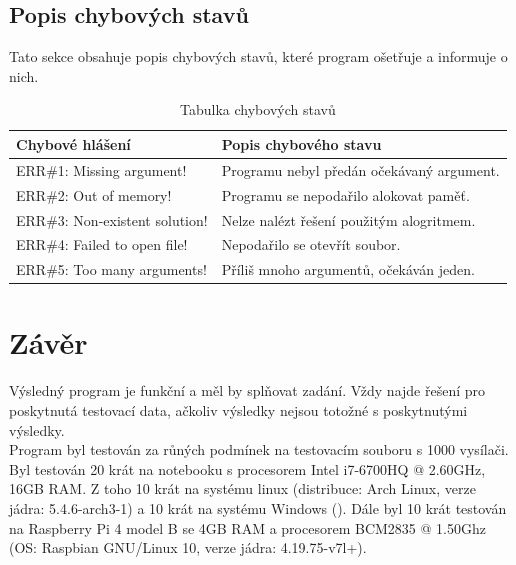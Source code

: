 \documentclass[12pt]{article}
\begin{document}
\subsection{Popis chybových stavů}
Tato sekce obsahuje popis chybových stavů, které program ošetřuje a informuje
o nich.
%
\begin{table}[H]
        \begin{tabular}{|l|p{6.35cm}|}
                \hline
                \bf Chybové hlášení & \bf Popis chybového stavu \\
                \hline
                ERR\#1: Missing argument! & Programu nebyl předán očekávaný
		argument.\\
		\hline
                ERR\#2: Out of memory! & Programu se nepodařilo alokovat
		paměť.\\
                \hline
                ERR\#3: Non-existent solution! & Nelze nalézt řešení použitým
		alogritmem.\\
                \hline
                ERR\#4: Failed to open file! & Nepodařilo se otevřít soubor.\\
                \hline
                ERR\#5: Too many arguments! & Příliš mnoho argumentů, očekáván
		jeden.\\
                \hline
        \end{tabular}
        \caption{Tabulka chybových stavů}
        \label{tab:err}
\end{table}
%
%
\section{Závěr}
%
Výsledný program je funkční a měl by splňovat zadání. Vždy najde řešení pro
poskytnutá testovací data, ačkoliv výsledky nejsou totožné s poskytnutými
výsledky.\\

Program byl testován za růných podmínek na testovacím souboru s 1000 vysílači.
Byl testován 20 krát na notebooku s 
procesorem Intel i7-6700HQ @ 2.60GHz, 16GB RAM. Z toho 10 krát na systému linux
(distribuce: Arch Linux, verze jádra: 5.4.6-arch3-1) a 10 krát na systému
Windows (). Dále byl 10 krát testován na Raspberry Pi 4 model B se 4GB RAM a 
procesorem BCM2835 @ 1.50Ghz (OS: Raspbian GNU/Linux 10,
verze jádra: 4.19.75-v7l+).\\
\end{document}
